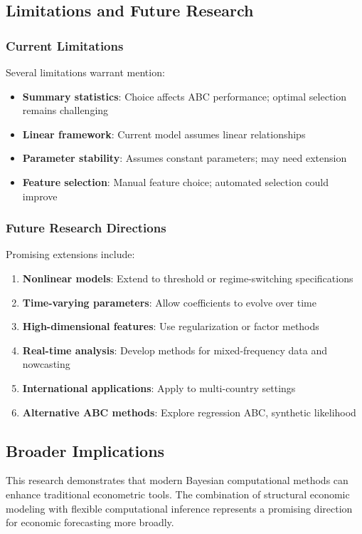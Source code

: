 \subsection{Limitations and Future Research}

\subsubsection{Current Limitations}

Several limitations warrant mention:

\begin{itemize}
    \item \textbf{Summary statistics}: Choice affects ABC performance; optimal selection remains challenging
    \item \textbf{Linear framework}: Current model assumes linear relationships
    \item \textbf{Parameter stability}: Assumes constant parameters; may need extension
    \item \textbf{Feature selection}: Manual feature choice; automated selection could improve
\end{itemize}

\subsubsection{Future Research Directions}

Promising extensions include:

\begin{enumerate}
    \item \textbf{Nonlinear models}: Extend to threshold or regime-switching specifications
    \item \textbf{Time-varying parameters}: Allow coefficients to evolve over time
    \item \textbf{High-dimensional features}: Use regularization or factor methods
    \item \textbf{Real-time analysis}: Develop methods for mixed-frequency data and nowcasting
    \item \textbf{International applications}: Apply to multi-country settings
    \item \textbf{Alternative ABC methods}: Explore regression ABC, synthetic likelihood
\end{enumerate}

\subsection{Broader Implications}

This research demonstrates that modern Bayesian computational methods can enhance traditional econometric tools. The combination of structural economic modeling with flexible computational inference represents a promising direction for economic forecasting more broadly.
